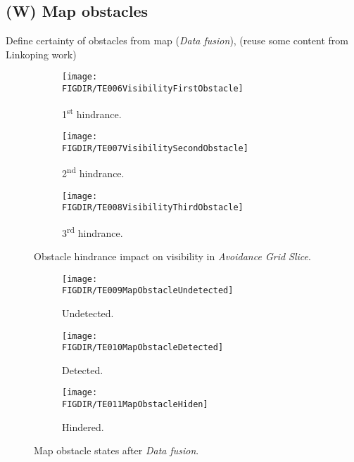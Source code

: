 \subsection{(W) Map obstacles}\label{s:mapObstacles}
    \noindent Define certainty of obstacles from map (\emph{Data fusion}), (reuse some content from Linkoping work)
    \begin{figure}[H]
        \begin{subfigure}{0.32\textwidth}
            \texttt{[image: \\FIGDIR/TE006VisibilityFirstObstacle]} 
            \caption{1\textsuperscript{st} hindrance.}
            \label{fig:fistObstacleHindrance}
        \end{subfigure}
        \begin{subfigure}{0.32\textwidth}
            \texttt{[image: \\FIGDIR/TE007VisibilitySecondObstacle]} 
            \caption{2\textsuperscript{nd} hindrance.}
            \label{fig:secondObstacleHindrance}
        \end{subfigure}
        \begin{subfigure}{0.32\textwidth}
            \texttt{[image: \\FIGDIR/TE008VisibilityThirdObstacle]} 
            \caption{3\textsuperscript{rd} hindrance.}
            \label{fig:thirdObstacleHindrance}
        \end{subfigure}
        \caption{Obstacle hindrance impact on visibility in \emph{Avoidance Grid Slice}.}
        \label{fig:hindranceImpactOnVisibility}
    \end{figure}
    
    
    \begin{figure}[H]
        \begin{subfigure}{0.32\textwidth}
            \texttt{[image: \\FIGDIR/TE009MapObstacleUndetected]} 
            \caption{Undetected.}
            \label{fig:undetectedMapObstalce.}
        \end{subfigure}
        \begin{subfigure}{0.32\textwidth}
            \texttt{[image: \\FIGDIR/TE010MapObstacleDetected]} 
            \caption{Detected.}
            \label{fig:detectedMapObstacle}
        \end{subfigure}
        \begin{subfigure}{0.32\textwidth}
            \texttt{[image: \\FIGDIR/TE011MapObstacleHiden]}
            \caption{Hindered.}
            \label{fig:hinderedMapObstacle}
        \end{subfigure}
        \caption{Map obstacle states after \emph{Data fusion}.}
        \label{fig:mapObstacleStatesAfterDataFusion}
    \end{figure}

